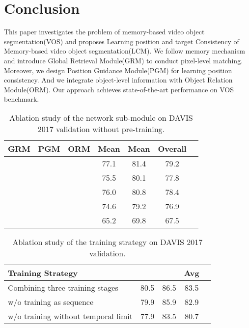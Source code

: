 \documentclass[final]{cvpr}
\begin{document}
\section{Conclusion}
This paper investigates the problem of memory-based video object segmentation(VOS) and proposes Learning position and target Consistency of Memory-based video object segmentation(LCM). We follow memory mechanism and introduce Global Retrieval Module(GRM) to conduct pixel-level matching. Moreover, we design Position Guidance Module(PGM) for learning position consistency. And we integrate object-level information with Object Relation Module(ORM). Our approach achieves state-of-the-art performance on VOS benchmark.






\begin{table}
	\centering
	\begin{center}
\begin{tabular}{ccccccc} 

\hline
 GRM & PGM & ORM &  Mean &  Mean & Overall \\
 \hline
   &  &  & 77.1 & 81.4 & 79.2 \\
 \hline
   &  &  & 75.5 & 80.1 & 77.8\\
   &  &  & 76.0 & 80.8 & 78.4\\
   &  &  & 74.6 & 79.2 & 76.9\\
 &  &  & 65.2 & 69.8 & 67.5\\
 
\hline
\end{tabular}
\end{center} 	\caption{Ablation study of the network sub-module on DAVIS 2017 validation without pre-training.}
	\label{table:ablation1}
\end{table}

\begin{table}
	\centering
	\begin{center}
\begin{tabular}{lcccc} 

\hline
Training Strategy &   &   & Avg \\
 \hline
Combining three training stages & 80.5 & 86.5 & 83.5 \\
 \hline
 w/o training as sequence  & 79.9 & 85.9 & 82.9\\
w/o training without temporal limit  & 77.9 & 83.5 & 80.7\\
 
\hline
\end{tabular}
\end{center} 	\caption{Ablation study of the training strategy on DAVIS 2017 validation.}
	\label{table:ablation2}
\end{table}
\end{document}
